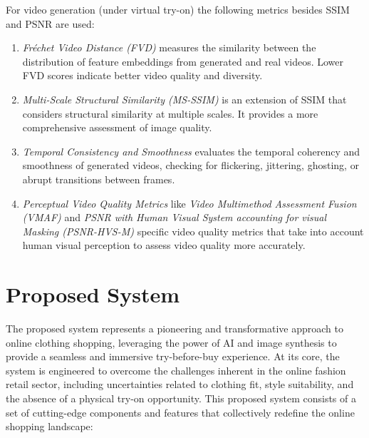 			For video generation (under virtual try-on) the following metrics besides SSIM and PSNR are used:

			\begin{enumerate}
				\item \textit{Fréchet Video Distance (FVD)} measures the similarity between the distribution of feature embeddings from generated and real videos. Lower FVD scores indicate better video quality and diversity.
				\item \textit{Multi-Scale Structural Similarity (MS-SSIM)} is an extension of SSIM that considers structural similarity at multiple scales. It provides a more comprehensive assessment of image quality.
				\item \textit{Temporal Consistency and Smoothness} evaluates the temporal coherency and smoothness of generated videos, checking for flickering, jittering, ghosting, or abrupt transitions between frames.
				\item \textit{Perceptual Video Quality Metrics} like \textit{Video Multimethod Assessment Fusion (VMAF)} and \textit{PSNR with Human Visual System accounting for visual Masking (PSNR-HVS-M)} specific video quality metrics that take into account human visual perception to assess video quality more accurately.
			\end{enumerate}

	\nocite{stocker2021new, DBLP:journals/csur/ChengSCHL21, Jain_Wah_2022, DBLP:journals/corr/abs-2202-02757, DBLP:journals/sncs/ShirkhaniMSH23, DBLP:journals/corr/abs-2111-00905, DBLP:journals/mta/GhodhbaniNRA22, DBLP:journals/cvm/LiangL21, menon2020impact, jayamini2021use, DBLP:journals/corr/abs-2202-09450, huang2019enhancing, mehta2020enhancement, zak2020augmented, caboni2019augmented, DBLP:journals/access/GiriJZB19, DBLP:journals/corr/abs-2105-03050, DBLP:journals/access/GuoZLCCW23, DBLP:journals/spm/ChenSC23, sahni2021review, liang2020implementation, sareen2022ai, 10153335, DBLP:journals/tmm/Yan0LZX0Y23}

\section{Proposed System}
    The proposed system represents a pioneering and transformative approach to online clothing shopping, leveraging the power of AI and image synthesis to provide a seamless and immersive try-before-buy experience. At its core, the system is engineered to overcome the challenges inherent in the online fashion retail sector, including uncertainties related to clothing fit, style suitability, and the absence of a physical try-on opportunity. This proposed system consists of a set of cutting-edge components and features that collectively redefine the online shopping landscape:

